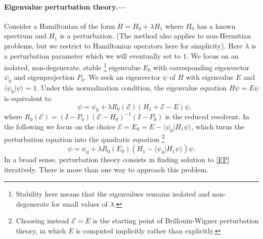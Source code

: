 \documentclass[aps,prl,reprint]{revtex4-2}
\begin{document}
    \paragraph{Eigenvalue perturbation theory.---}
	Consider a Hamiltonian of the form $H = H_0  +  \lambda H_1 $ where $H_0$ has a known spectrum and $H_1$ is a perturbation. (The method also applies to non-Hermitian problems, but we restrict to Hamiltonian operators here for simplicity). Here $\lambda$ is a perturbation parameter which we will eventually set to $1$. We focus on an isolated, non-degenerate, stable \footnote{Stability here means that the eigenvalues remains isolated and non-degenerate for small values of $\lambda$.} eigenvalue $E_0$ with corresponding eigenvector $\psi_0$ and eigenprojection $P_0$. We seek an eigenvector $\psi$ of $H$ with eigenvalue $E$ and $\langle \psi_0\vert \psi\rangle = 1$. Under this normalization condition, the eigenvalue equation $H \psi = E\psi$ is equivalent to
	\begin{equation}
	   \quad \psi = \psi_0 +  \lambda R_0(\mathcal{E})( H_1  + \mathcal{E}-E)\psi,\nonumber
	\end{equation}
	where $R_0(\mathcal{E}) = (I-P_0)(\mathcal{E} - H_0)^{-1}(I-P_0)$ is the reduced resolvent. In the following we focus on the choice $\mathcal{E} = E_0 = E - \langle \psi_0 \vert H_1 \psi\rangle$, which turns the perturbation equation into the quadratic equation \footnote{Choosing instead $\mathcal{E} = E$ is the starting point of Brillouin-Wigner perturbation theory, in which $E$ is computed implicitly rather than explicitly.}
	\begin{equation}\label{FP}
	  \psi = \psi_0 + \lambda R_0(E_0 )( H_1  -\langle \psi_0 \vert H_1 \psi\rangle )\psi.
	\end{equation}
	In a broad sense, perturbation theory consists in finding solution to \eqref{FP} iteratively. There is more than one way to approach this problem.
\end{document}
